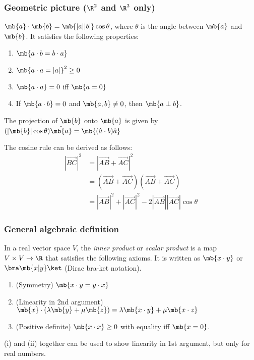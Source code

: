 \documentclass[a4paper]{article}
\begin{document}
\subsubsection{Geometric picture (\texorpdfstring{$\R^2$}{R2} and \texorpdfstring{$\R^3$}{R3} only)}
\begin{defi}
  $\mb{a}\cdot\mb{b} = \mb{|a||b|}\cos\theta$, where $\theta$ is the angle between $\mb{a}$ and $\mb{b}$. It satisfies the following properties:
  \begin{enumerate}
  \item $\mb{a\cdot b = b\cdot a}$
  \item $\mb{a\cdot a = |a|}^2 \geq 0$
  \item $\mb{a\cdot a} = 0$ iff $\mb{a = 0}$
  \item If $\mb{a\cdot b} = 0$ and $\mb{a, b}\not= 0$, then $\mb{a \perp b}$.
  \end{enumerate}
\end{defi}

The projection of $\mb{b}$ onto $\mb{a}$ is given by $(|\mb{b}|\cos\theta)\hat{\mb{a}} = \mb{(\hat{a}\cdot b)\hat{a}}$

The cosine rule can be derived as follows:
\begin{align*}
  |\overrightarrow{BC}|^2 &= |\overrightarrow{AB} + \overrightarrow{AC}|^2\\
  &= (\overrightarrow{AB} + \overrightarrow{AC})(\overrightarrow{AB} + \overrightarrow{AC})\\
  &= |\overrightarrow{AB}|^2 + |\overrightarrow{AC}|^2 - 2|\overrightarrow{AB}||\overrightarrow{AC}|\cos\theta
\end{align*}

\subsubsection{General algebraic definition}
\begin{defi}
  In a real vector space $V$, the \emph{inner product} or \emph{scalar product} is a map $V\times V\to \R$ that satisfies the following axioms. It is written as $\mb{x\cdot y}$ or $\bra\mb{x|y}\ket$ (Dirac bra-ket notation).
  \begin{enumerate}
  \item (Symmetry) $\mb{x\cdot y = y\cdot x}$
  \item (Linearity in 2nd argument) $\mb{x}\cdot (\lambda\mb{y} + \mu\mb{z}) = \lambda\mb{x\cdot y} + \mu\mb{x\cdot z}$
  \item (Positive definite) $\mb{x\cdot x}\geq 0$ with equality iff $\mb{x = 0}$.
  \end{enumerate}
\end{defi}
\note (i) and (ii) together can be used to show linearity in 1st argument, but only for real numbers.
\end{document}
